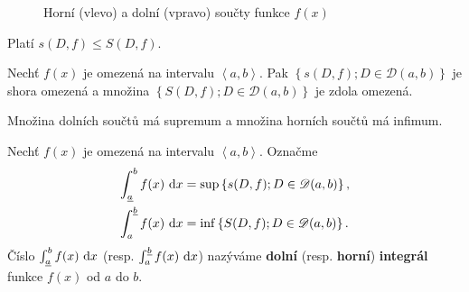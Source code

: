 \begin{figure}[ht!]
  \caption{Horní (vlevo) a dolní (vpravo) součty funkce $f(x)$}
\end{figure}

\begin{pozn}
    Platí $s(D,f)\leq S(D,f).$
\end{pozn}

\begin{veta}
Nechť $f(x)$ je omezená na intervalu $\left<  a,b \right>. $ Pak
$\left \{ s(D,f); D\in \mathscr D(a,b) \right \} $ je shora omezená a množina
$\left \{ S(D,f); D\in \mathscr D(a,b) \right \} $ je zdola omezená.
\end{veta}

\begin{pozn}
     Množina dolních součtů má supremum a množina horních součtů má infimum.
\end{pozn}

\begin{definition}
Nechť $f(x)$ je omezená na intervalu $\left<  a,b \right> .$ Označme
\begin{align*}
    \int_{\underline{a}} ^b f(x) \, \mathop{}\!\mathrm{d} x & = \sup \left \{ s(D,f); D \in \mathscr D(a,b) \right \}, \\
    \int_{a} ^{\underline{b}} f(x) \, \mathop{}\!\mathrm{d} x & = \inf \left \{ S(D,f); D \in \mathscr D(a,b) \right \}.
\end{align*}
Číslo $\int_{\underline{a}} ^b f(x)\, \mathop{}\!\mathrm{d} x$ (resp. $\int_{a} ^{\underline{b}} f(x) \, \mathop{}\!\mathrm{d} x$)
nazýváme \textbf{dolní} (resp. \textbf{horní}) \textbf{integrál} funkce $f(x)$ od
$a$ do $b$.
\end{definition}

